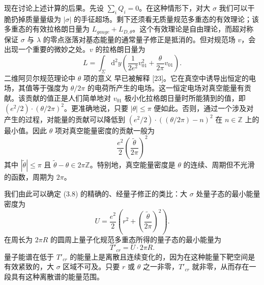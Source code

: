 现在讨论上述计算的后果。先设 $\sum_iQ_i=0$。在这种情形下，对大 $\sigma$ 我们可以干脆扔掉质量量级为 $|\sigma|$ 的手征超场。剩下还须看无质量规范多重态的有效理论；该多重态的有效拉格朗日量为 $L_{gauge}+L_{D,\theta}$。这个有效理论是自由理论，而超对称保证 $\sigma$ 与 $\lambda$ 的零点涨落对基态能量的通常量子修正是抵消的。但对规范场 $v$，会出现一个重要的微妙之处。$v$ 的拉格朗日量为
\begin{equation}\tag{3.14}
L=\int_\Sigma\mathrm{d}^2y\left(\frac{1}{2e^2}v_{01}^2+\frac{\theta}{2\pi}v_{01}\right).
\end{equation}
二维阿贝尔规范理论中 $\theta$ 项的意义
\label{op:24}
早已被解释 [23]。它在真空中诱导出恒定的电场，其值等于强度为 $\theta/2\pi$ 的电荷所产生的电场。这一恒定电场对真空能量有贡献。该贡献的值正是人们简单地对 $v_{01}$ 极小化拉格朗日量时所能猜到的值，即 $(e^2/2)\cdot(\theta/2\pi)^2$。更准确地说，只要 $|\theta|\le\pi$ 便如此。否则，通过一个涉及对产生的过程，对能量的贡献可以降低到 $(e^2/2)\cdot((\theta/2\pi)-n)^2$ 在 $n\in\mathbb{Z}$ 上的最小值。因此 $\theta$ 项对真空能量密度的贡献一般为
\begin{equation}\tag{3.15}
\frac{e^2}{2}\left(\frac{\tilde\theta}{2\pi}\right)^2
\end{equation}
其中 $|\tilde\theta|\le\pi$ 且 $\tilde\theta-\theta\in2\pi\mathbb{Z}$。特别地，真空能量密度是 $\theta$ 的连续、周期但不光滑的函数，周期为 $2\pi$。


我们由此可以确定 (3.8) 的精确的、经量子修正的类比：大 $\sigma$ 处量子态的最小能量密度为
\begin{equation}\tag{3.16}
U=\frac{e^2}{2}\left(r^2+\left(\frac{\tilde\theta}{2\pi}\right)^2\right).
\end{equation}
在周长为 $2\pi R$ 的圆周上量子化规范多重态所得的量子态的最小能量为
\begin{equation}\tag{3.17}
T'_{cr}=U\cdot2\pi R.
\end{equation}
量子能谱在低于 $T'_{cr}$ 的能量上是离散且连续变化的，因为在这种能量下靶空间是有效紧致的，大 $\sigma$ 区域不可及。只要 $r$ 或 $\theta$ 之一非零，$T'_{cr}$ 就非零，从而存在一段具有这种离散谱的能量范围。

